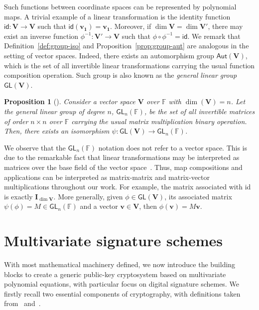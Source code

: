 \documentclass[12pt, a4paper, oneside]{memoir}
\newtheorem{proposition}[theorem]{Proposition}
\theoremstyle{definition}
\begin{document}
Such functions between coordinate spaces can be represented by polynomial maps. A trivial example of a linear transformation is the identity function $\mathsf{id} : \mathbf{V} \to \mathbf{V}$ such that $\mathsf{id}(\mathbf{v_{1}}) = \mathbf{v_{1}}$. Moreover, if $\dim \mathbf{V} = \dim \mathbf{V'}$, there may exist an inverse function $\phi^{-1} : \mathbf{V'} \to \mathbf{V}$ such that $\phi \circ \phi^{-1} = \mathsf{id}$. We remark that Definition~\ref{def:group-iso} and Proposition~\ref{prop:group-aut} are analogous in the setting of vector spaces. Indeed, there exists an automorphism group $\mathsf{Aut}(\mathbf{V})$, which is the set of all invertible linear transformations carrying the usual function composition operation. Such group is also known as the \emph{general linear group} $\mathsf{GL}(\mathbf{V})$.

\begin{proposition}[{\cite[p.~418, Cor.~14]{Dummit:2003}}]
  Consider a vector space $\mathbf{V}$ over $\mathbb{F}$ with $\dim(\mathbf{V}) = n$. Let the \emph{general linear group of degree $n$, $\mathsf{GL}_{n}(\mathbb{F})$}, be the set of all invertible matrices of order $n \times n$ over $\mathbb{F}$ carrying the usual matrix multiplication binary operation. Then, there exists an isomorphism $\psi : \mathsf{GL}(\mathbf{V}) \to \mathsf{GL}_{n}(\mathbb{F})$.
\end{proposition}

We observe that the $\mathsf{GL}_{n}(\mathbb{F})$ notation does not refer to a vector space. This is due to the remarkable fact that linear transformations may be interpreted as matrices over the base field of the vector space~\cite[Section 11.2]{Dummit:2003}. Thus, map compositions and applications can be interpreted as matrix-matrix and matrix-vector multiplications throughout our work. For example, the matrix associated with \textsf{id} is exactly $\mathbf{I}_{\dim \mathbf{V}}$. More generally, given $\phi \in \mathsf{GL}(\mathbf{V})$, its associated matrix $\psi(\phi) = M \in \mathsf{GL}_{n}(\mathbb{F})$ and a vector $\mathbf{v} \in \mathbf{V}$, then $\phi(\mathbf{v}) = M\mathbf{v}$.

\section{Multivariate signature schemes}\label{sec:mult}

With most mathematical machinery defined, we now introduce the building blocks to create a generic public-key cryptosystem based on multivariate polynomial equations, with particular focus on digital signature schemes. We firstly recall two essential components of cryptography, with definitions taken from~\cite[Section 7.1]{Gathen:2015} and~\cite[Section 6.1]{Goldreich:2004}.
\end{document}
